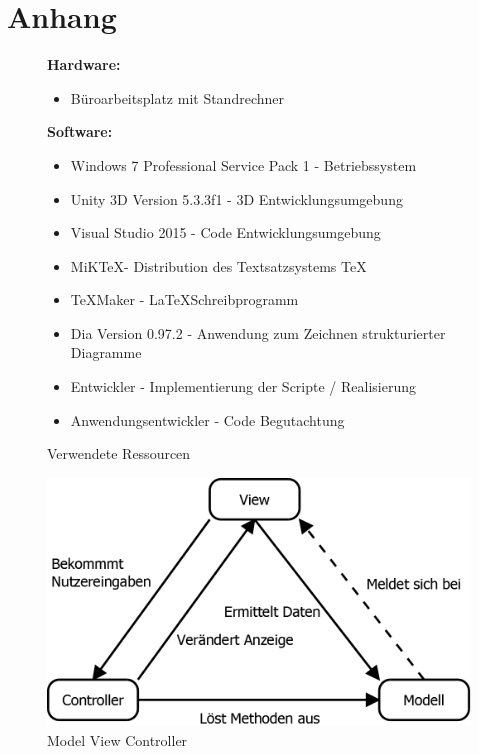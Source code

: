 \chapter{Anhang}

\begin{figure}[H]
\raggedright
\caption{Verwendete Ressourcen}
\label{Abb:Ressourcen}
\textbf{Hardware:}
\begin{itemize}
\item Büroarbeitsplatz mit Standrechner
\end{itemize}
\textbf{Software:}
\begin{itemize}
\item Windows 7 Professional Service Pack 1 - Betriebssystem
\item Unity 3D Version 5.3.3f1 - 3D Entwicklungsumgebung
\item Visual Studio 2015 - Code Entwicklungsumgebung
\item MiK\TeX - Distribution des Textsatzsystems \TeX
\item \TeX{}Maker - \LaTeX Schreibprogramm
\item Dia Version 0.97.2 - Anwendung zum Zeichnen strukturierter Diagramme
\end{itemize}
\begin{itemize}
\item Entwickler - Implementierung der Scripte / Realisierung
\item Anwendungsentwickler - Code Begutachtung
\end{itemize}
\end{figure}

\begin{figure}[H]
\centering
\caption{Model View Controller}
\label{Abb:MVC}
\includegraphics[scale=0.5]{Bilder/Diagramme/MVC.png}
\end{figure}

